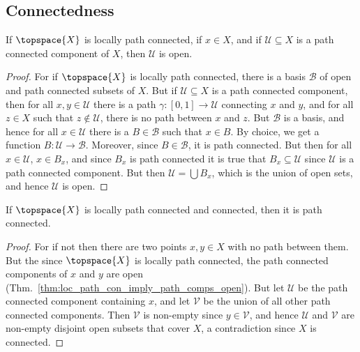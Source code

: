     \subsection{Connectedness}
        \begin{theorem}
            \label{thm:loc_path_con_imply_path_comps_open}%
            If $\topspace{X}$ is locally path connected, if $x\in{X}$, and if
            $\mathcal{U}\subseteq{X}$ is a path connected component of $X$,
            then $\mathcal{U}$ is open.
        \end{theorem}
        \begin{proof}
            For if $\topspace{X}$ is locally path connected, there is a basis
            $\mathcal{B}$ of open and path connected subsets of $X$. But if
            $\mathcal{U}\subseteq{X}$ is a path connected component, then for
            all $x,y\in\mathcal{U}$ there is a path
            $\gamma:[0,1]\rightarrow\mathcal{U}$ connecting $x$ and $y$, and for
            all $z\in{X}$ such that $z\notin\mathcal{U}$, there is no path
            between $x$ and $z$. But $\mathcal{B}$ is a basis, and hence for
            all $x\in\mathcal{U}$ there is a $B\in\mathcal{B}$ such that
            $x\in{B}$. By choice, we get a function
            $B:\mathcal{U}\rightarrow\mathcal{B}$. Moreover, since
            $B\in\mathcal{B}$, it is path connected. But then for all
            $x\in\mathcal{U}$, $x\in{B}_{x}$, and since $B_{x}$ is path
            connected it is true that $B_{x}\subseteq\mathcal{U}$ since
            $\mathcal{U}$ is a path connected component. But then
            $\mathcal{U}=\bigcup{B}_{x}$, which is the union of open sets, and
            hence $\mathcal{U}$ is open.
        \end{proof}
        \begin{theorem}
            \label{thm:Loc_Path_and_Con_Imply_Path_Con}
            If $\topspace{X}$ is locally path connected and connected, then it
            is path connected.
        \end{theorem}
        \begin{proof}
            For if not then there are two points $x,y\in{X}$ with no path
            between them. But the since $\topspace{X}$ is locally path
            connected, the path connected components of $x$ and $y$ are open
            (Thm.~\ref{thm:loc_path_con_imply_path_comps_open}). But let
            $\mathcal{U}$ be the path connected component containing $x$, and
            let $\mathcal{V}$ be the union of all other path connected
            components. Then $\mathcal{V}$ is non-empty since $y\in\mathcal{V}$,
            and hence $\mathcal{U}$ and $\mathcal{V}$ are non-empty disjoint
            open subsets that cover $X$, a contradiction since $X$ is connected.
        \end{proof}
